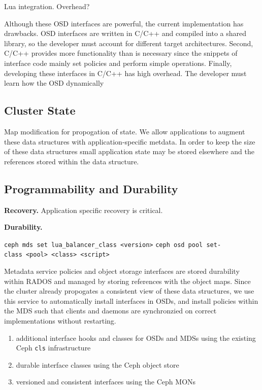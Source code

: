 \documentclass[10pt,twocolumn]{article}
\begin{document}
%

Lua integration. Overhead?

Although these OSD interfaces are powerful, the current implementation
has drawbacks. OSD interfaces are written in C/C++ and compiled into a
shared library, so the developer must account for different target
architectures. Second, C/C++ provides more functionality than is
necessary since the snippets of interface code mainly set policies and
perform simple operations. Finally, developing these interfaces in C/C++
has high overhead. The developer must learn how the OSD dynamically

\subsection{Cluster State}

Map modification for propogation of state. We allow applications to augment
these data structures with application-specific metdata. In order to keep the
size of these data structures small application state may be stored elsewhere
and the references stored within the data structure.

\subsection{Programmability and Durability}

{\bf Recovery.}
Application specific recovery is critical.

{\bf Durability.}

\noindent \texttt{ceph\ mds\ set\ lua\_balancer\_class\ \textless{}version\textgreater{}}
\noindent \texttt{ceph\ osd\ pool\ set-class\ \textless{}pool\textgreater{}\ \textless{}class\textgreater{}\ \textless{}script\textgreater{}}

Metadata service policies and object storage interfaces are stored durability
within RADOS and managed by storing references with the object maps. Since
the cluster already propogates a consistent view of these data structures,
we use this service to automatically install interfaces in OSDs, and install
policies within the MDS such that clients and daemons are synchronzied on
correct implementations without restarting.

\iffalse
\begin{enumerate}
\def\labelenumi{\arabic{enumi}.}
\item
  additional interface hooks and classes for OSDs and MDSs using the
  existing Ceph \texttt{cls} infrastructure
\item
  durable interface classes using the Ceph object store
\item
  versioned and consistent interfaces using the Ceph MONs
\end{enumerate}
\end{document}
